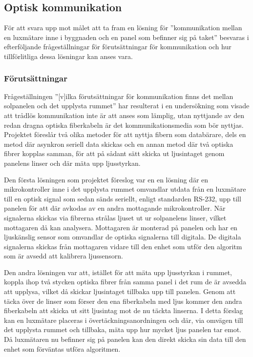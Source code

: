     \subsection{Optisk kommunikation} %
    \label{sub:optisk_kommunikation}
        För att svara upp mot målet att ta fram en lösning för ''kommunikation mellan en luxmätare inne i byggnaden och en panel som befinner sig på taket'' besvaras i efterföljande frågeställningar för förutsättningar för kommunikation och hur tillförlitliga dessa lösningar kan anses vara.

        \subsubsection{Förutsättningar} %
        \label{sub:forutsattningar}
                
            Frågeställningen ''[v]ilka förutsättningar för kommunikation finns det mellan solpanelen och det upplysta rummet'' har resulterat i en undersökning som visade att trådlös kommunikation inte är att anses som lämplig, utan nyttjande av den redan dragna optiska fiberkabeln är det kommunikationsmedia som bör nyttjas. Projektet föreslår två olika metoder för att nyttja fibern som databärare, dels en metod där asynkron seriell data skickas och en annan metod där två optiska fibrer kopplas samman, för att på sådant sätt skicka ut ljusintaget genom panelens linser och där mäta upp ljusstyrkan.\bigskip

            Den första lösningen som projektet föreslog var en en lösning där en mikrokontroller inne i det upplysta rummet omvandlar utdata från en luxmätare till en optisk signal som sedan sänds seriellt, enligt standarden RS-232, upp till panelen för att där avkodas av en andra mottagande mikrokontroller. När signalerna skickas via fibrerna strålas ljuset ut ur solpanelens linser, vilket mottagaren då kan analysera. Mottagaren är monterad på panelen och har en ljuskänslig sensor som omvandlar de optiska signalerna till digitala. De digitala signalerna skickas från mottagaren vidare till den enhet som utför den algoritm som är avsedd att kalibrera ljussensorn. \bigskip

            Den andra lösningen var att, istället för att mäta upp ljusstyrkan i rummet, koppla ihop två stycken optiska fibrer från samma panel i det rum de är avsedda att upplysa, vilket då skickar ljusintaget tillbaka upp till panelen. Genom att täcka över de linser som förser den ena fiberkabeln med ljus kommer den andra fiberkabeln att skicka ut sitt ljusintag mot de nu täckta linserna. I detta förslag kan en luxmätare placeras i övertäckningsanordningen och där, via omvägen till det upplysta rummet och tillbaka, mäta upp hur mycket ljus panelen tar emot. Då luxmätaren nu befinner sig på panelen kan den direkt skicka sin data till den enhet som förväntas utföra algoritmen.

